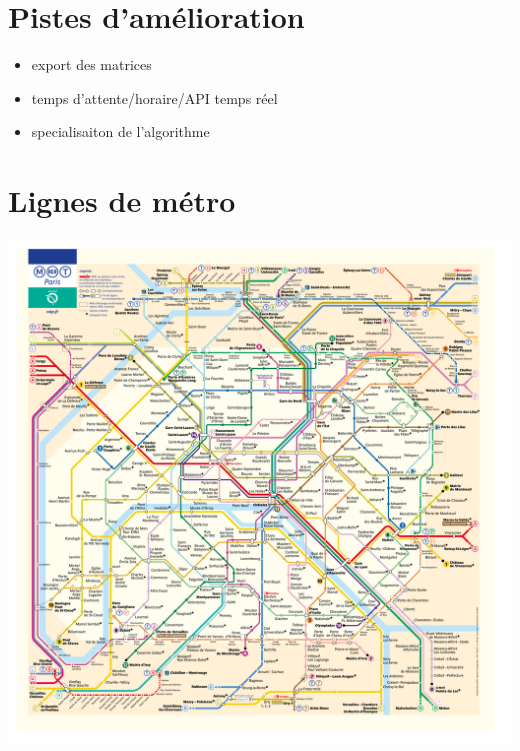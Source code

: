 \documentclass[,french]{article}
\begin{document}
\hypertarget{sec:amelioration}{%
\section{Pistes d'amélioration}\label{sec:amelioration}}

\begin{itemize}
\item
  export des matrices
\item
  temps d'attente/horaire/API temps réel
\item
  specialisaiton de l'algorithme
\end{itemize}

\hypertarget{sec:lignes_metro}{%
\section{Lignes de métro}\label{sec:lignes_metro}}

\includegraphics{img/plan_lignes/Plan-Metro.pdf}
\end{document}
